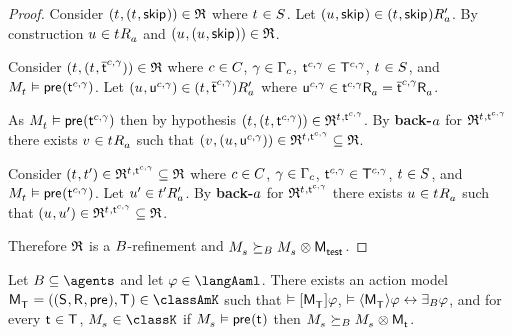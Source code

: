 \begin{proof}
Consider $(\kStateT, (\kStateT, \aStateSkip)) \in \refinement$ where $\kStateT \in \kStates$.
Let $(\kStateU, \aStateSkip) \in \kSuccessorsPA{(\kStateT, \aStateSkip)}$.
By construction $\kStateU \in \kSuccessorsA{\kStateT}$ and $(\kStateU, (\kStateU, \aStateSkip)) \in \refinement$.

Consider $(\kStateT, (\kStateT, \aPStateT[\agentC, \gamma])) \in \refinement$ where $\agentC \in \agentsC$, $\gamma \in \Gamma_\agentC$, $\aStateT[\agentC, \gamma] \in \aStatesT[\agentC, \gamma]$, $\kStateT \in \kStates$, and $\kPModel{\kStateT} \entails \aPrecondition(\aStateT[\agentC, \gamma])$.
Let $(\kStateU, \aStateU[\agentC, \gamma]) \in \kSuccessorsPA{(\kStateT, \aPStateT[\agentC, \gamma])}$ where $\aStateU[\agentC, \gamma] \in \aSuccessorsA{\aStateT[\agentC, \gamma]} = \aSuccessorsA{\aPStateT[\agentC, \gamma]}$.

As $\kPModel{\kStateT} \entails \aPrecondition(\aStateT[\agentC, \gamma])$ then by hypothesis $(\kStateT, (\kStateT, \aStateT[\agentC, \gamma])) \in \refinement^{\kStateT, \aStateT[\agentC, \gamma]}$.
By {\bf back-$\agentA$} for $\refinement^{\kStateT, \aStateT[\agentC, \gamma]}$ there exists $\kStateV \in \kSuccessorsA{\kStateT}$ such that $(\kStateV, (\kStateU, \aStateU[\agentC, \gamma])) \in \refinement^{\kStateT, \aStateT[\agentC, \gamma]} \subseteq \refinement$.

Consider $(\kStateT, \kStateTP) \in \refinement^{\kStateT, \aStateT[\agentC, \gamma]} \subseteq \refinement$ where $\agentC \in \agentsC$, $\gamma \in \Gamma_\agentC$, $\aStateT[\agentC, \gamma] \in \aStatesT[\agentC, \gamma]$, $\kStateT \in \kStates$, and $\kPModel{\kStateT} \entails \aPrecondition(\aStateT[\agentC, \gamma])$.
Let $\kStateUP \in \kSuccessorsPA{\kStateTP}$.
By {\bf back-$\agentA$} for $\refinement^{\kStateT, \aStateT[\agentC, \gamma]}$ there exists $\kStateU \in \kSuccessorsA{\kStateT}$ such that $(\kStateU, \kStateUP) \in \refinement^{\kStateT, \aStateT[\agentC, \gamma]} \subseteq \refinement$.

Therefore $\refinement$ is a $\agentsB$-refinement and $\kPModel{\kStateS} \simulatesBs \kPModel{\kStateS} \exec \aPModel{\aStateTest}$.

\end{proof}

\begin{theorem}\label{aaml-k-synthesis}
Let $\agentsB \subseteq \agents$ and let $\phi \in \langAaml$.
There exists an action model $\aPModelAndTuple{\aStatesT} \in \classAmK$ such that 
$\entails \actionA{\aPModel{\aStatesT}} \phi$,
$\entails \actionE{\aPModel{\aStatesT}} \phi \iff \someactsBs \phi$, and
for every $\aStateT \in \aStatesT$, $\kPModel{\kStateS} \in \classK$ if $\kPModel{\kStateS} \entails \aPrecondition(\aStateT)$ then $\kPModel{\kStateS} \simulatesBs \kPModel{\kStateS} \exec \aPModel{\aStateT}$.
\end{theorem}

